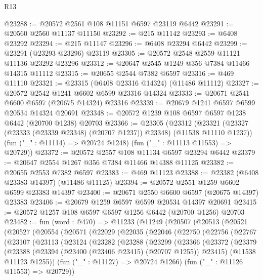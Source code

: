 \begin{lexlean}{R13}
\begin{coremodule}
@23288 := @20572 @2561 @108 @11151 @6597 @23119 @6442
@23291 := @20560 @2560 @11137 @11150
@23292 := @215 @11142
@23293 := @6408 @23292
@23294 := @215 @11147
@23296 := @6408 @23294 @6442
@23299 := @23291 (@23293 @23296) @23119
@23305 := @20572 @2548 @2559 @11121 @11136 @23292 @23296
@23312 := @20647 @2545 @1249 @356 @7384 @11466 @14315 @11112
@23315 := @20655 @2544 @7382 @6597
@23316 := @469 @11110
@23321 := @23315 (@6408 @23316 @14324) (@11486 @11112)
@23327 := @20572 @2542 @1241 @6602 @6599 @23316 @14324
@23333 := @20671 @2541 @6600 @6597 (@20675 @14324) @23316
@23339 := @20679 @1241 @6597 @6599 @20534 @14324 @20691
@23348 := @20572 @1239 @108 @6597 @6597 @1238 @6442 (@20700 @1238) @20703
@23366 := @23305
    (@23312
      (@23321 (@23327 (@23333 (@23339 @23348) (@20707 @1237)) @23348) (@11538 @11110 @1237))
      (fun ("_" : @11114) => @20724 @1248)
      (fun ("_" : @11113 @11553) => @20729))
@23372 := @20572 @2557 @108 @11134 @6597 @23294 @6442
@23379 := @20647 @2554 @1267 @356 @7384 @11466 @14388 @11125
@23382 := @20655 @2553 @7382 @6597
@23383 := @469 @11123
@23388 := @23382 (@6408 @23383 @14397) (@11486 @11125)
@23394 := @20572 @2551 @1259 @6602 @6599 @23383 @14397
@23400 := @20671 @2550 @6600 @6597 (@20675 @14397) @23383
@23406 := @20679 @1259 @6597 @6599 @20534 @14397 @20691
@23415 := @20572 @1257 @108 @6597 @6597 @1256 @6442 (@20700 @1256) @20703
@23482 := fun (word : @470) =>
  @11233
    (@11249
      (@20507
        (@20513
          (@20521
            (@20527
              (@20554
                (@20571
                  (@22029
                    (@22035
                      (@22046
                        (@22750
                          (@22756
                            (@22767
                              (@23107
                                (@23113
                                  (@23124
                                    (@23282
                                      (@23288
                                        (@23299
                                          (@23366
                                            (@23372
                                              (@23379
                                                (@23388
                                                  (@23394
                                                    (@23400 (@23406 @23415) (@20707 @1255))
                                                    @23415)
                                                  (@11538 @11123 @1255))
                                                (fun ("_" : @11127) => @20724 @1266)
                                                (fun ("_" : @11126 @11553) => @20729))

\end{coremodule}
\end{lexlean}
